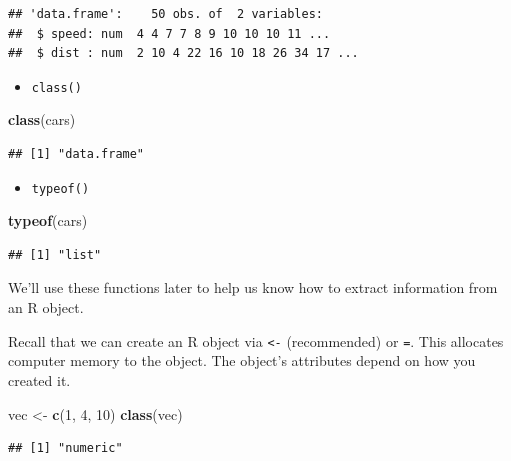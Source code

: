 \documentclass[
]{book}
\newenvironment{Shaded}{\begin{snugshade}}{\end{snugshade}}
\newcommand{\DecValTok}[1]{\textcolor[rgb]{0.00,0.00,0.81}{#1}}
\newcommand{\KeywordTok}[1]{\textcolor[rgb]{0.13,0.29,0.53}{\textbf{#1}}}
\newcommand{\NormalTok}[1]{#1}
\newcommand{\StringTok}[1]{\textcolor[rgb]{0.31,0.60,0.02}{#1}}
\providecommand{\tightlist}{%
  \setlength{\itemsep}{0pt}\setlength{\parskip}{0pt}}
\theoremstyle{definition}
\theoremstyle{definition}
\theoremstyle{definition}
\theoremstyle{remark}
\begin{document}
\begin{verbatim}
## 'data.frame':    50 obs. of  2 variables:
##  $ speed: num  4 4 7 7 8 9 10 10 10 11 ...
##  $ dist : num  2 10 4 22 16 10 18 26 34 17 ...
\end{verbatim}

\begin{itemize}
\tightlist
\item
  \texttt{class()}
\end{itemize}

\begin{Shaded}
\begin{Highlighting}[]
\KeywordTok{class}\NormalTok{(cars)}
\end{Highlighting}
\end{Shaded}

\begin{verbatim}
## [1] "data.frame"
\end{verbatim}

\begin{itemize}
\tightlist
\item
  \texttt{typeof()}
\end{itemize}

\begin{Shaded}
\begin{Highlighting}[]
\KeywordTok{typeof}\NormalTok{(cars)}
\end{Highlighting}
\end{Shaded}

\begin{verbatim}
## [1] "list"
\end{verbatim}

We'll use these functions later to help us know how to extract information from an R object.

Recall that we can create an R object via \texttt{\textless{}-} (recommended) or \texttt{=}. This allocates computer memory to the object. The object's attributes depend on how you created it.

\begin{Shaded}
\begin{Highlighting}[]
\NormalTok{vec <-}\StringTok{ }\KeywordTok{c}\NormalTok{(}\DecValTok{1}\NormalTok{, }\DecValTok{4}\NormalTok{, }\DecValTok{10}\NormalTok{)}
\KeywordTok{class}\NormalTok{(vec)}
\end{Highlighting}
\end{Shaded}

\begin{verbatim}
## [1] "numeric"
\end{verbatim}
\end{document}
